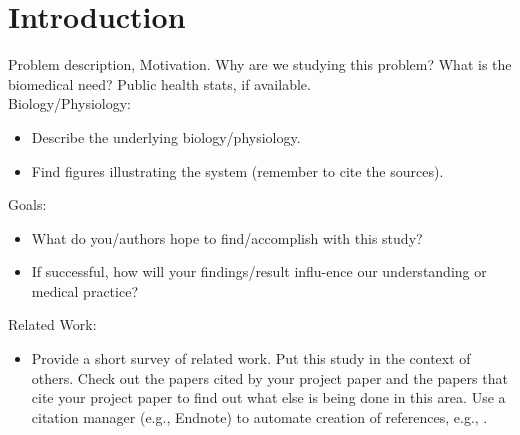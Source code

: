 
\section{Introduction}

Problem description, Motivation. Why are we studying this problem? What is the
biomedical need? Public health stats, if available.\\

Biology/Physiology:
\begin{itemize}
    \item Describe the underlying biology/physiology.
    \item Find figures illustrating the system (remember to cite the sources).
\end{itemize}

Goals:
\begin{itemize}
    \item What do you/authors hope to find/accomplish with this study?
    \item If successful, how will your findings/result influ-ence our understanding or medical practice?
\end{itemize}

Related Work:
\begin{itemize}
    \item Provide a short survey of related work. Put this study in the context of others. Check out the papers cited by your project paper and the papers that cite your project paper to find out what else is being done in this area. Use a citation manager (e.g., Endnote) to automate creation of references, e.g., \cite{smith2010}.
\end{itemize}
